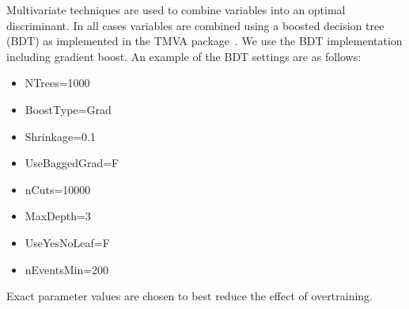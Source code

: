 \noindent

Multivariate techniques are used to combine variables into an optimal discriminant.  
In all cases variables are combined using a boosted decision tree (BDT) as implemented in the TMVA package~\cite{Hocker:2007ht}.
We use the BDT implementation including gradient boost.  
An example of the BDT settings are as follows: 
\begin{itemize}
\item NTrees=1000
\item BoostType=Grad
\item Shrinkage=0.1
\item UseBaggedGrad=F
\item nCuts=10000
\item MaxDepth=3
\item UseYesNoLeaf=F
\item nEventsMin=200
\end{itemize}
Exact parameter values are chosen to best reduce the effect of overtraining.